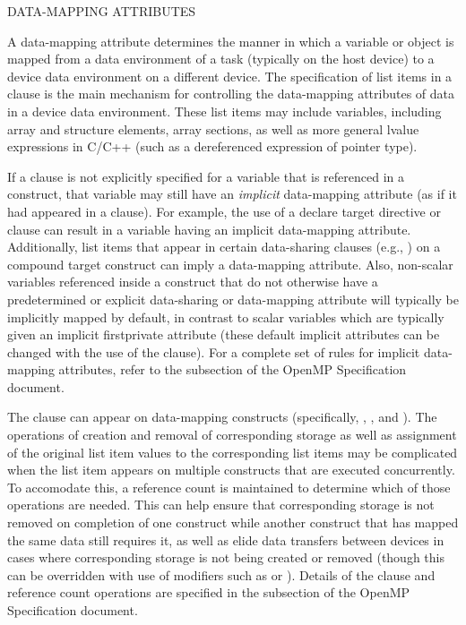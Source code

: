 \bigskip
DATA-MAPPING ATTRIBUTES

A data-mapping attribute determines the manner in which a variable or object is
mapped from a data environment of a task (typically on the host device) to a
device data environment on a different device. The specification of list items
in a  clause is the main mechanism for controlling the data-mapping
attributes of data in a device data environment. These list items may include
variables, including array and structure elements, array sections, as well as
more general lvalue expressions in C/C++ (such as a dereferenced expression of
pointer type).

If a  clause is not explicitly specified for a variable that is
referenced in a  construct, that variable may still have an
\emph{implicit} data-mapping attribute (as if it had appeared in a 
clause). For example, the use of a declare target directive or
 clause can result in a variable having an implicit
data-mapping attribute. Additionally, list items that appear in certain
data-sharing clauses (e.g., ) on a compound target construct
can imply a data-mapping attribute. Also, non-scalar variables referenced
inside a  construct that do not otherwise have a predetermined or
explicit data-sharing or data-mapping attribute will typically be implicitly
mapped by default, in contrast to scalar variables which are typically given
an implicit firstprivate attribute (these default implicit attributes can be
changed with the use of the  clause). For a complete set of
rules for implicit data-mapping attributes, refer to the
subsection of the OpenMP Specification document.

The  clause can appear on data-mapping constructs (specifically,
, ,  and
).  The operations of creation and removal of corresponding
storage as well as assignment of the original list item values to the
corresponding list items may be complicated when the list item appears on
multiple constructs that are executed concurrently. To accomodate this, a
reference count is maintained to determine which of those operations are
needed. This can help ensure that corresponding storage is not removed on
completion of one construct while another construct that has mapped the same
data still requires it, as well as elide data transfers between devices in
cases where corresponding storage is not being created or removed (though this
can be overridden with use of modifiers such as  or
). Details of the  clause and reference count
operations are specified in the  subsection of the
OpenMP Specification document.


